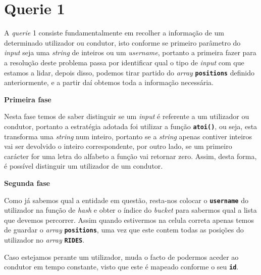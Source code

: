 \documentclass[12pt,a4paper]{report}
\begin{document}
\section{Querie 1}

A \textit{querie} 1 consiste fundamentalmente em recolher a informação de um determinado utilizador ou condutor, isto conforme se primeiro parâmetro do \textit{input} seja uma \textit{string} de inteiros ou um \textit{username}, portanto a primeira fazer para a resolução deste problema passa por identificar qual o tipo de \textit{input} com que estamos a lidar, depois disso, podemos tirar partido do \textit{array} \textbf{\small\texttt{positions}} definido anteriormente, e a partir daí obtemos toda a informação necessária.    

\normalsize\textbf{Primeira fase}

Nesta fase temos de saber distinguir se um \textit{input} é referente a um utilizador ou condutor, portanto a estratégia adotada foi utilizar a função \textbf{\small\texttt{atoi()}}, ou seja, esta transforma uma \textit{string} num inteiro, portanto se a \textit{string} apenas contiver inteiros vai ser devolvido o inteiro correspondente, por outro lado, se um primeiro carácter for uma letra do alfabeto a função vai retornar zero. Assim, desta forma, é possível distinguir um utilizador de um condutor.  

\normalsize\textbf{Segunda fase}

Como já sabemos qual a entidade em questão, resta-nos colocar o \textbf{\small\texttt{username}} do utilizador na função de \textit{hash} e obter o índice do \textit{bucket} para sabermos qual a lista que devemos percorrer. Assim quando estivermos na celula correta apenas temos de guardar o \textit{array} \textbf{\small\texttt{positions}}, uma vez que este contem todas as posições do utilizador no \textit{array} \textbf{\small\texttt{RIDES}}.

Caso estejamos perante um utilizador, muda o facto de podermos aceder ao condutor em tempo constante, visto que este é mapeado conforme o seu \textbf{\small\texttt{id}}.
\end{document}
